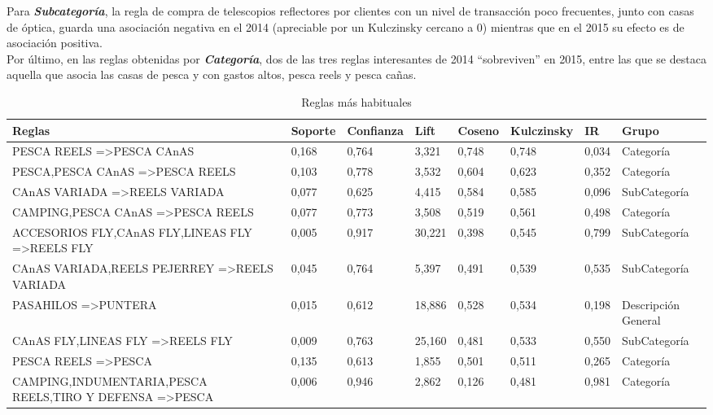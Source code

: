 \documentclass[]{article}
\begin{document}
	Para \textbf{\textit{Subcategoría}}, la regla de compra de telescopios reflectores por clientes con un nivel de transacción poco frecuentes, junto con casas de óptica, guarda una asociación negativa en el 2014 (apreciable por un Kulczinsky cercano a 0) mientras que en el 2015 su efecto es de asociación positiva.\\ 
	
	Por último, en las reglas obtenidas por \textit{\textbf{Categoría}}, dos de las tres reglas interesantes de 2014 “sobreviven” en 2015, entre las que se destaca aquella que asocia las casas de pesca y con gastos altos, pesca reels y pesca cañas.\\
	
	
	\begin{landscape}
		
		\begin{table}[]
			\centering
			\caption{Reglas más habituales}
			\label{Tab_Reg_Habituales}%
			\begin{tabular}{llllllll}
				{\bf Reglas}                                                                         & {\bf Soporte} & {\bf Confianza} & {\bf Lift} & {\bf Coseno} & {\bf Kulczinsky} & {\bf IR} & {\bf Grupo} \\
				\hline
				PESCA REELS =\textgreater PESCA CAnAS                               & 0,168   & 0,764 & 3,321  & 0,748  & 0,748  & 0,034 & Categoría           \\
				PESCA,PESCA CAnAS =\textgreater PESCA REELS                         & 0,103   & 0,778 & 3,532  & 0,604  & 0,623  & 0,352 & Categoría           \\
				CAnAS VARIADA =\textgreater REELS VARIADA                           & 0,077   & 0,625 & 4,415  & 0,584  & 0,585  & 0,096 & SubCategoría        \\
				CAMPING,PESCA CAnAS =\textgreater PESCA REELS                       & 0,077   & 0,773 & 3,508  & 0,519  & 0,561  & 0,498 & Categoría           \\
				ACCESORIOS FLY,CAnAS FLY,LINEAS FLY =\textgreater REELS FLY         & 0,005   & 0,917 & 30,221 & 0,398  & 0,545  & 0,799 & SubCategoría        \\
				CAnAS VARIADA,REELS PEJERREY =\textgreater REELS VARIADA            & 0,045   & 0,764 & 5,397  & 0,491  & 0,539  & 0,535 & SubCategoría        \\
				PASAHILOS =\textgreater PUNTERA                                     & 0,015   & 0,612 & 18,886 & 0,528  & 0,534  & 0,198 & Descripción General \\
				CAnAS FLY,LINEAS FLY =\textgreater REELS FLY                        & 0,009   & 0,763 & 25,160 & 0,481  & 0,533  & 0,550 & SubCategoría        \\
				PESCA REELS =\textgreater PESCA                                     & 0,135   & 0,613 & 1,855  & 0,501  & 0,511  & 0,265 & Categoría           \\
				CAMPING,INDUMENTARIA,PESCA REELS,TIRO Y DEFENSA =\textgreater PESCA & 0,006   & 0,946 & 2,862  & 0,126  & 0,481  & 0,981 & Categoría          
			\end{tabular}
		\end{table}		
		

\end{landscape}
\end{document}
